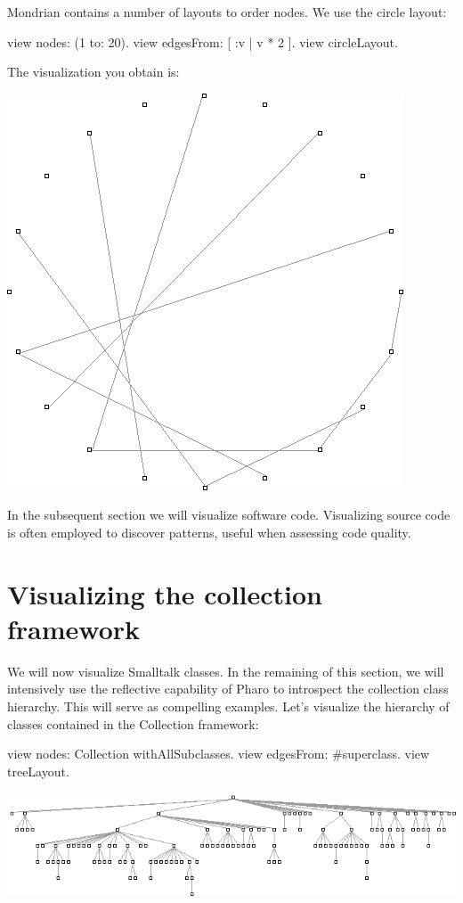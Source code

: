 \documentclass[a4paper,10pt,twoside]{book}
\begin{document}
Mondrian contains a number of layouts to order nodes. We use the circle layout:

\begin{code}{}
view nodes: (1 to: 20).
view edgesFrom: [ :v | v * 2 ].
view circleLayout.
\end{code}

The visualization you obtain is:

\begin{center}\includegraphics[scale=0.4]{picture3}\end{center}

In the subsequent section we will visualize software code. Visualizing source code is often employed to discover patterns, useful when assessing code quality.


\section{Visualizing the collection framework}

We will now visualize Smalltalk classes. In the remaining of this section, we will intensively use the reflective capability of Pharo to introspect the collection class hierarchy. This will serve as compelling examples. Let's visualize the hierarchy of classes contained in the Collection framework:

\begin{code}{}
view nodes: Collection withAllSubclasses.
view edgesFrom: #superclass.
view treeLayout.
\end{code}
\begin{center}\includegraphics[scale=0.4]{picture4}\end{center}
\end{document}
